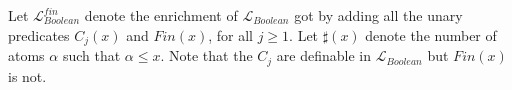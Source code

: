 \documentclass[12pt]{amsart}
\def\cL{\mathcal{L}}
\def\cL{\mathcal{L}}
\numberwithin{equation}{section}
\begin{document}
Let $\mathcal{L}_{Boolean}^{fin}$ denote the enrichment of $\cL_{Boolean}$ 
got by adding all the unary predicates $C_j(x)$ and $Fin(x)$, for all $j\geq 1$. 
Let $\sharp(x)$ denote the number of atoms $\alpha$ such that $\alpha \leq x$. Note that the $C_j$ are definable in 
$\cL_{Boolean}$ but $Fin(x)$ is not.                                                                                                                                                                                                                                                                                                                                                                                                                                                                                                                                                                                                                                                                                                                                                                                                                                                                                                                                                                                                                                                                                                                                                                                                                                                                                                                                                                                                                                                                                                                                                                                                                                                                                                                                                                                                                                                                                                                                                                                                                                                                                                                                                                                                                                                                                                                                                                                                                                                                                                                                                                                                                                                                                                                                                                                                                                                                                                                                                                                                                                                                                                                                                 
\end{document}
